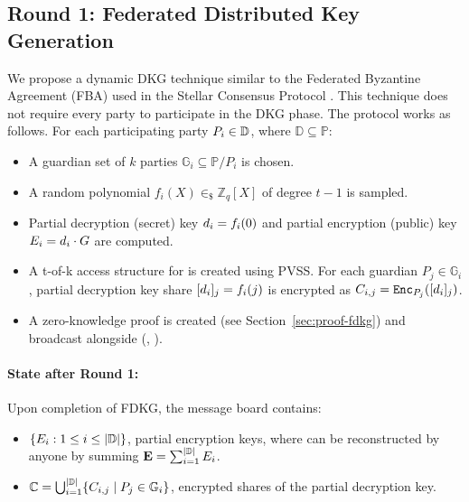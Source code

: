 \documentclass[runningheads]{llncs}
\begin{document}
\subsection{Round 1: Federated Distributed Key Generation}
We propose a dynamic DKG technique similar to the Federated Byzantine Agreement (FBA) used in the Stellar Consensus Protocol \cite{mazieresStellarConsensusProtocol2015}. This technique does not require every party to participate in the DKG phase. The protocol works as follows. For each participating party $P_{i} \in \mathbb{D}$, where $\mathbb{D} \subseteq  \mathbb{P}$:
\begin{itemize}
    \item A guardian set of $k$ parties $\mathbb{G}_i\subseteq \mathbb{P}/P_i$ is chosen.
    \item A random polynomial $f_{i}(X) \in_{\$} \mathbb{Z}_q[X]$ of degree $t-1$ is sampled.
    \item Partial decryption (secret) key $d_{i}= f_i(0)$ and partial encryption (public) key $E_{i} = d_{i} \cdot G$ are computed.
    \item A t-of-k access structure for  is created using PVSS. For each guardian $P_{j} \in \mathbb{G}_i$, partial decryption key share $[d_{i}]_{j}=f_i(j)$ is encrypted as $C_{i,j}=\texttt{Enc}_{P_{j}}([d_{i}]_{j})$.
    \item A zero-knowledge proof  is created (see Section~\ref{sec:proof-fdkg}) and broadcast alongside (, ).
\end{itemize}

\paragraph*{State after Round 1:}
Upon completion of FDKG, the message board contains:
\begin{itemize}
    \item $\{E_{i} : 1 \leq i \leq |\mathbb{D}|\}$, partial encryption keys, where \EncryptionKey{} can be reconstructed by anyone by summing $\textbf{E}=\sum_{i=1}^{|\mathbb{D}|} E_{i}$.
    \item $\mathbb{C} = \bigcup_{i=1}^{|\mathbb{D}|} \{C_{i,j} \mid P_j \in \mathbb{G}_i\}$, encrypted shares of the partial decryption key.
\end{itemize}
\end{document}
